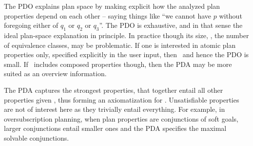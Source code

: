 %

The PDO explains plan space by making explicit how the analyzed plan
properties depend on each other -- saying things like ``we cannot have
$p$ without foregoing either of $q_1$ or $q_2$ or $q_3$''. The PDO is
exhaustive, and in that sense the ideal plan-space explanation in
principle. In practice though its size, \ie, the number of equivalence
classes, may be problematic. If one is interested in atomic plan
properties only, specified explicitly in the user input, then
\props\ and hence the PDO is small. If \props\ includes composed
properties though, then the PDA may be more suited as an overview
information.

The PDA captures the strongest properties, that together entail all
other properties given \plans, thus forming an axiomatization for
\plans. Unsatisfiable properties are not of interest here as they
trivially entail everything. For example, in oversubscription
planning, when plan properties are conjunctions of soft goals, larger
conjunctions entail smaller ones and the PDA specifies the maximal
solvable conjunctions.

%

